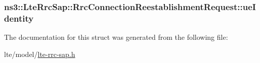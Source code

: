 \subsubsection[{\texorpdfstring{ue\+Identity}{ueIdentity}}]{ ns3\+::\+Lte\+Rrc\+Sap\+::\+Rrc\+Connection\+Reestablishment\+Request\+::ue\+Identity}\hypertarget{structns3_1_1LteRrcSap_1_1RrcConnectionReestablishmentRequest_af4b77e49ed18202b2a340a1312088f5d}{}\label{structns3_1_1LteRrcSap_1_1RrcConnectionReestablishmentRequest_af4b77e49ed18202b2a340a1312088f5d}


The documentation for this struct was generated from the following file\+:\begin{DoxyCompactItemize}
\item 
lte/model/\hyperlink{lte-rrc-sap_8h}{lte-\/rrc-\/sap.\+h}\end{DoxyCompactItemize}
